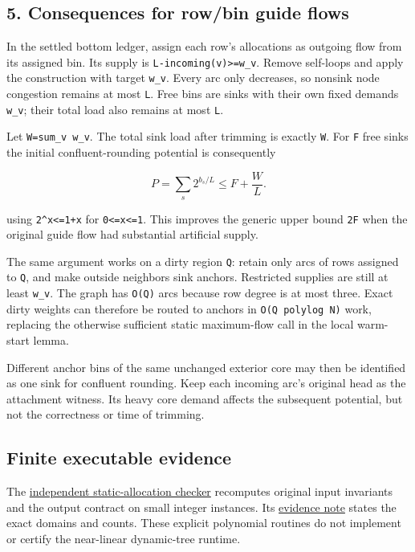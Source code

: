 \hypertarget{af-32c0fc642d-consequences-for-rowbin-guide-flows}{%
\subsection{5. Consequences for row/bin guide flows}\label{af-32c0fc642d-consequences-for-rowbin-guide-flows}}

In the settled bottom ledger, assign each row's allocations as outgoing flow from its assigned bin. Its supply is \texttt{L-incoming(v)\textgreater{}=w\_v}. Remove self-loops and apply the construction with target \texttt{w\_v}. Every arc only decreases, so nonsink node congestion remains at most \texttt{L}. Free bins are sinks with their own fixed demands \texttt{w\_v}; their total load also remains at most \texttt{L}.

Let \texttt{W=sum\_v\ w\_v}. The total sink load after trimming is exactly \texttt{W}. For \texttt{F} free sinks the initial confluent-rounding potential is consequently

\[
P=\sum_s2^{b_s/L}\le F+\frac WL.
\]

using \texttt{2\^{}x\textless{}=1+x} for \texttt{0\textless{}=x\textless{}=1}. This improves the generic upper bound \texttt{2F} when the original guide flow had substantial artificial supply.

The same argument works on a dirty region \texttt{Q}: retain only arcs of rows assigned to \texttt{Q}, and make outside neighbors sink anchors. Restricted supplies are still at least \texttt{w\_v}. The graph has \texttt{O(\textbar{}Q\textbar{})} arcs because row degree is at most three. Exact dirty weights can therefore be routed to anchors in \texttt{O(\textbar{}Q\textbar{}\ polylog\ N)} work, replacing the otherwise sufficient static maximum-flow call in the local warm-start lemma.

Different anchor bins of the same unchanged exterior core may then be identified as one sink for confluent rounding. Keep each incoming arc's original head as the attachment witness. Its heavy core demand affects the subsequent potential, but not the correctness or time of trimming.

\hypertarget{af-32c0fc642d-finite-executable-evidence}{%
\subsection{Finite executable evidence}\label{af-32c0fc642d-finite-executable-evidence}}

The \href{https://github.com/icekylinx/algorithm-frontier/blob/main/manuscripts/graph-backends/verify/check_static_allocations.py}{independent static-allocation checker} recomputes original input invariants and the output contract on small integer instances. Its \href{https://github.com/icekylinx/algorithm-frontier/blob/main/manuscripts/graph-backends/verify/README.md\#independent-flow-and-transportation-checks}{evidence note} states the exact domains and counts. These explicit polynomial routines do not implement or certify the near-linear dynamic-tree runtime.

